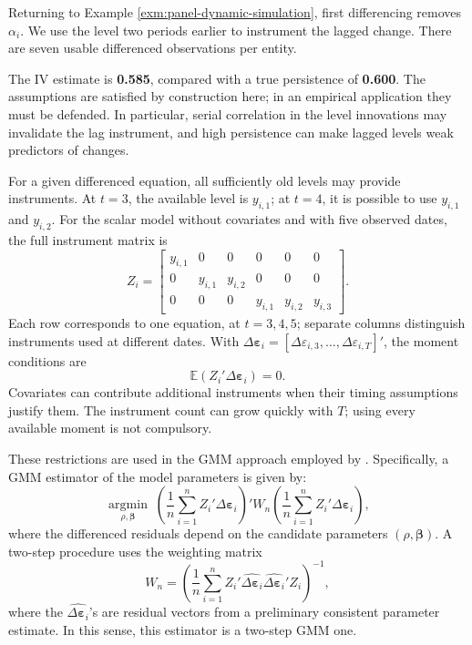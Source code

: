 \documentclass[
  11pt,
]{book}
\theoremstyle{definition}
\theoremstyle{definition}
\theoremstyle{definition}
\theoremstyle{definition}
\theoremstyle{remark}
\begin{document}
Returning to Example \ref{exm:panel-dynamic-simulation}, first differencing removes \(\alpha_i\). We use the level two periods earlier to instrument the lagged change. There are seven usable differenced observations per entity.

The IV estimate is \textbf{0.585}, compared with a true persistence of \textbf{0.600}. The assumptions are satisfied by construction here; in an empirical application they must be defended. In particular, serial correlation in the level innovations may invalidate the lag instrument, and high persistence can make lagged levels weak predictors of changes.

For a given differenced equation, all sufficiently old levels may provide instruments. At \(t=3\), the available level is \(y_{i,1}\); at \(t=4\), it is possible to use \(y_{i,1}\) and \(y_{i,2}\). For the scalar model without covariates and with five observed dates, the full instrument matrix is
\[
Z_i=\begin{bmatrix}
y_{i,1}&0&0&0&0&0\\
0&y_{i,1}&y_{i,2}&0&0&0\\
0&0&0&y_{i,1}&y_{i,2}&y_{i,3}
\end{bmatrix}.
\]
Each row corresponds to one equation, at \(t=3,4,5\); separate columns distinguish instruments used at different dates. With \(\Delta\boldsymbol\varepsilon_i=[\Delta\varepsilon_{i,3},\ldots,\Delta\varepsilon_{i,T}]'\), the moment conditions are
\[
\mathbb{E}(Z_i'\Delta\boldsymbol\varepsilon_i)=0.
\]
Covariates can contribute additional instruments when their timing assumptions justify them. The instrument count can grow quickly with \(T\); using every available moment is not compulsory.

These restrictions are used in the GMM approach employed by \citet{Arellano_Bond_1991}. Specifically, a GMM estimator of the model parameters is given by:
\[
\underset{\rho,\boldsymbol\beta}{\operatorname{argmin}}\;\left(\frac{1}{n} \sum_{i=1}^n Z_i' \Delta \boldsymbol\varepsilon_i\right)'W_n\left(\frac{1}{n} \sum_{i=1}^n Z_i' \Delta \boldsymbol\varepsilon_i\right),
\]
where the differenced residuals depend on the candidate parameters \((\rho,\boldsymbol\beta)\). A two-step procedure uses the weighting matrix
\[
W_n = \left(\frac{1}{n}\sum_{i=1}^n Z_i'\widehat{\Delta\boldsymbol\varepsilon_i}\widehat{\Delta\boldsymbol\varepsilon_i}'Z_i\right)^{-1},
\]
where the \(\widehat{\Delta\boldsymbol\varepsilon_i}\)'s are residual vectors from a preliminary consistent parameter estimate. In this sense, this estimator is a two-step GMM one.
\end{document}
